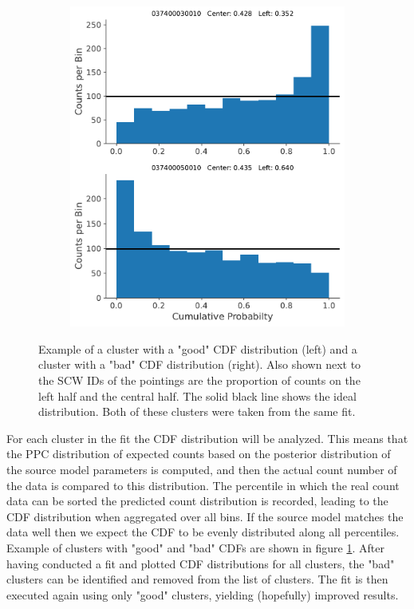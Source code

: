 \documentclass{report}
\begin{document}
\begin{figure}[h]
\begin{subfigure}{.5\textwidth}
    \includegraphics[width=.9\linewidth]{Images/PPC_and_Background_Analysis/037400030010_037400050010_cdf.pdf}
  \end{subfigure}
  \caption{Example of a cluster with a "good" CDF distribution (left) and a cluster with a "bad" CDF distribution (right). Also shown next to the SCW IDs of the pointings are the proportion of counts on the left half and the central half. The solid black line shows the ideal distribution. Both of these clusters were taken from the same fit.}
  \label{fig ppc cdf ex good and bad}
  \end{figure}



For each cluster in the fit the CDF distribution will be analyzed. This means that the PPC distribution of expected counts based on the posterior distribution of the source model parameters is computed, and then the actual count number of the data is compared to this distribution. The percentile in which the real count data can be sorted the predicted count distribution is recorded, leading to the CDF distribution when aggregated over all bins. If the source model matches the data well then we expect the CDF to be evenly distributed along all percentiles. Example of clusters with "good" and "bad" CDFs are shown in figure \ref{fig ppc cdf ex good and bad}. After having conducted a fit and plotted CDF distributions for all clusters, the "bad" clusters can be identified and removed from the list of clusters. The fit is then executed again using only "good" clusters, yielding (hopefully) improved results.
\end{document}
